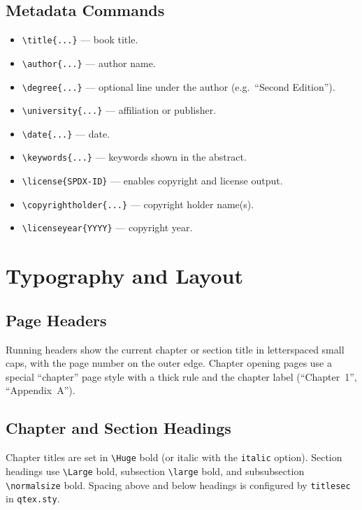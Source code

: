 \documentclass[sans,oneside,numeric,raggedright,fullwidth]{qbook}
\begin{document}
\lipsum[3]

\section{Metadata Commands}\label{sec:metadata}

\begin{itemize}
    \item \verb|\title{...}| --- book title.
    \item \verb|\author{...}| --- author name.
    \item \verb|\degree{...}| --- optional line under the author (e.g.\
    ``Second Edition'').
    \item \verb|\university{...}| --- affiliation or publisher.
    \item \verb|\date{...}| --- date.
    \item \verb|\keywords{...}| --- keywords shown in the abstract.
    \item \verb|\license{SPDX-ID}| --- enables copyright and license output.
    \item \verb|\copyrightholder{...}| --- copyright holder name(s).
    \item \verb|\licenseyear{YYYY}| --- copyright year.
\end{itemize}

\chapter{Typography and Layout}\label{ch:typography}

\section{Page Headers}

Running headers show the current chapter or section title in letterspaced
small caps, with the page number on the outer edge.  Chapter opening pages
use a special ``chapter'' page style with a thick rule and the chapter
label (``Chapter~1'', ``Appendix~A'').

\lipsum[4]

\section{Chapter and Section Headings}

Chapter titles are set in \verb|\Huge| bold (or italic with the
\texttt{italic} option).  Section headings use \verb|\Large| bold,
subsection \verb|\large| bold, and subsubsection \verb|\normalsize| bold.
Spacing above and below headings is configured by \texttt{titlesec} in
\texttt{qtex.sty}.
\end{document}
